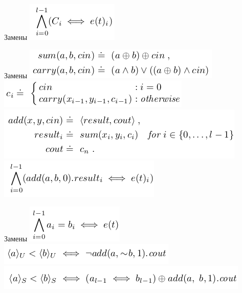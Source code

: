 \documentclass{beamer}
\begin{document}
\begin{frame}{Замены}
\includegraphics[scale=0.5]{skel.png}\newline
\end{frame}

\begin{frame}{Замены}
\includegraphics[scale=0.5]{sum1.png}\newline
\includegraphics[scale=0.5]{sum2.png}\newline
\includegraphics[scale=0.5]{sum3.png}\newline
\includegraphics[scale=0.5]{sum4.png}\newline
\end{frame}

\begin{frame}{Замены}
\includegraphics[scale=0.5]{rel1.png}\newline
\includegraphics[scale=0.5]{rel2.png}\newline
\includegraphics[scale=0.5]{rel3.png}\newline
\end{frame}
\end{document}
